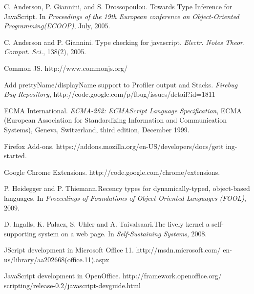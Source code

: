 \documentclass[10pt, preprint]{sigplanconf}
\begin{document}


\begin{thebibliography}{}
\softraggedright


C. Anderson, P. Giannini, and S. Drossopoulou. \newblock Towards Type Inference for JavaScript.
\newblock In \emph{Proceedings of the 19th European conference on Object-Oriented Programming(ECOOP)},
July, 2005.

C. Anderson and P. Giannini. \newblock Type checking for javascript.
\newblock \emph{Electr. Notes Theor. Comput. Sci.}, 138(2), 2005. 

Common JS.
\newblock http://www.commonjs.org/

Add prettyName/displayName support to Profiler output and Stacks.
\newblock \emph{Firebug Bug Repository},
\newblock http://code.google.com/p/fbug/issues/detail?id=1811

ECMA International.
\newblock \emph{ECMA-262: ECMAScript Language Specification},
ECMA (European Association for Standardizing Information
and Communication Systems), Geneva, Switzerland, third edition,
December 1999. 

Firefox Add-ons.
\newblock https://addons.mozilla.org/en-US/developers/docs/gett ing-started.

Google Chrome Extensions.
\newblock http://code.google.com/chrome/extensions.

P. Heidegger and P. Thiemann.\newblock Recency types for dynamically-typed, object-based languages.
\newblock In \emph{Proceedings of Foundations of Object Oriented Languages (FOOL)},
2009.

D. Ingalls, K. Palacz, S. Uhler and A. Taivalsaari.\newblock The lively kernel a self-supporting system on
a web page.
\newblock In \emph{Self-Sustaining Systems},
2008.

JScript development in Microsoft Office 11.
\newblock http://msdn.microsoft.com/ en-us/library/aa202668(office.11).aspx

JavaScript development in OpenOffice.
\newblock http://framework.openoffice.org/ scripting/release-0.2/javascript-devguide.html


\end{thebibliography}
\end{document}
